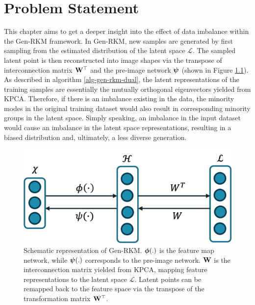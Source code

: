 \chapter{Problem Statement}
\label{chap-ps}
This chapter aims to get a deeper insight into the effect of data imbalance within the Gen-RKM framework. In Gen-RKM, new samples are generated by first sampling from the estimated distribution of the latent space $\mathcal{L}$. The sampled latent point is then reconstructed into image shapes via the transpose of interconnection matrix $\mathbf{W}^{\top}$ and the pre-image network $\boldsymbol{\psi}$ (shown in Figure \ref{rkm-demo}). As described in algorithm \ref{alg-gen-rkm-dual}, the latent representations of the training samples are essentially the mutually orthogonal eigenvectors yielded from KPCA. Therefore, if there is an imbalance existing in the data, the minority modes in the original training dataset would also result in corresponding minority groups in the latent space. Simply speaking, an imbalance in the input dataset would cause an imbalance in the latent space representations, resulting in a biased distribution and, ultimately, a less diverse generation. 

\begin{figure}[ht]
    \centering
    \includegraphics[width=0.7\linewidth]{Figures/PS/rkm_structure.png}
    \caption{Schematic representation of Gen-RKM. $\boldsymbol{\phi}(.)$ is the feature map network, while $\boldsymbol{\psi}(.)$ corresponds to the pre-image network. $\mathbf{W}$ is the interconnection matrix yielded from KPCA, mapping feature representations to the latent space $\mathcal{L}$. Latent points can be remapped back to the feature space via the transpose of the transformation matrix $\mathbf{W}^{\top}$.}
    \label{rkm-demo}
\end{figure}


